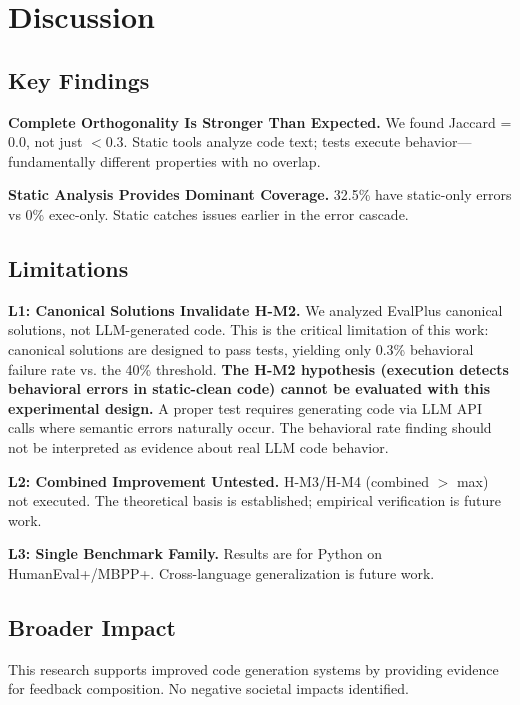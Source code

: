 \section{Discussion}
\label{sec:discussion}

\subsection{Key Findings}

\textbf{Complete Orthogonality Is Stronger Than Expected.} We found Jaccard = 0.0, not just $< 0.3$. Static tools analyze code text; tests execute behavior---fundamentally different properties with no overlap.

\textbf{Static Analysis Provides Dominant Coverage.} 32.5\% have static-only errors vs 0\% exec-only. Static catches issues earlier in the error cascade.

\subsection{Limitations}

\textbf{L1: Canonical Solutions Invalidate H-M2.} We analyzed EvalPlus canonical solutions, not LLM-generated code. This is the critical limitation of this work: canonical solutions are designed to pass tests, yielding only 0.3\% behavioral failure rate vs. the 40\% threshold. \textbf{The H-M2 hypothesis (execution detects behavioral errors in static-clean code) cannot be evaluated with this experimental design.} A proper test requires generating code via LLM API calls where semantic errors naturally occur. The behavioral rate finding should not be interpreted as evidence about real LLM code behavior.

\textbf{L2: Combined Improvement Untested.} H-M3/H-M4 (combined $>$ max) not executed. The theoretical basis is established; empirical verification is future work.

\textbf{L3: Single Benchmark Family.} Results are for Python on HumanEval+/MBPP+. Cross-language generalization is future work.

\subsection{Broader Impact}

This research supports improved code generation systems by providing evidence for feedback composition. No negative societal impacts identified.
